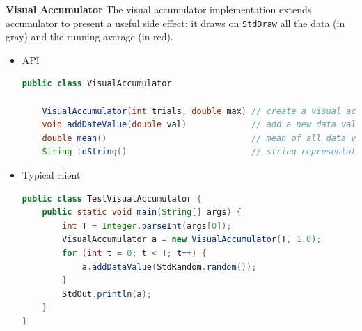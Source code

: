 \documentclass[8pt,a4paper,compress]{beamer}
\begin{document}
\begin{frame}[fragile]
\pause

\textbf{Visual Accumulator} The visual accumulator implementation extends accumulator to present a useful side effect: it draws on \lstinline$StdDraw$ all the data (in gray) and the running average (in red).
\begin{itemize}
\item API
\begin{lstlisting}[language=Java]
public class VisualAccumulator

    VisualAccumulator(int trials, double max) // create a visual accumulator
    void addDateValue(double val)             // add a new data value
    double mean()                             // mean of all data values
    String toString()                         // string representation
\end{lstlisting}

\pause
\item Typical client
\begin{lstlisting}[language=Java]
public class TestVisualAccumulator {
    public static void main(String[] args) {
        int T = Integer.parseInt(args[0]);
        VisualAccumulator a = new VisualAccumulator(T, 1.0);
        for (int t = 0; t < T; t++) {
            a.addDataValue(StdRandom.random());
        }
        StdOut.println(a);
    }
}
\end{lstlisting}


\end{itemize}
\end{frame}
\end{document}
